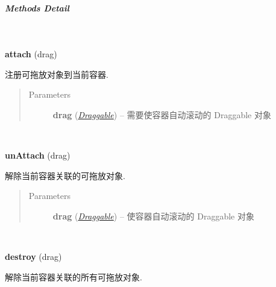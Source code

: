 \documentclass[letterpaper,10pt,english]{sphinxmanual}
\begin{document}
\subparagraph{Methods Detail}
\label{api/component/dd/scroll:methods-detail}

\begin{fulllineitems}
\label{api/component/dd/scroll:Scroll.attach}~
\begin{DUlineblock}{0em}
\item[] \textbf{attach} (drag)
\item[] 注册可拖放对象到当前容器.
\end{DUlineblock}
\begin{quote}\begin{description}
\item[{Parameters}] \leavevmode
\textbf{drag} ({\hyperref[api/component/dd/draggable:module-Draggable]{\emph{Draggable}}}) -- 需要使容器自动滚动的 Draggable 对象

\end{description}\end{quote}

\end{fulllineitems}



\begin{fulllineitems}
\label{api/component/dd/scroll:Scroll.unAttach}~
\begin{DUlineblock}{0em}
\item[] \textbf{unAttach} (drag)
\item[] 解除当前容器关联的可拖放对象.
\end{DUlineblock}
\begin{quote}\begin{description}
\item[{Parameters}] \leavevmode
\textbf{drag} ({\hyperref[api/component/dd/draggable:module-Draggable]{\emph{Draggable}}}) -- 使容器自动滚动的 Draggable 对象

\end{description}\end{quote}

\end{fulllineitems}



\begin{fulllineitems}
\label{api/component/dd/scroll:Scroll.destroy}~
\begin{DUlineblock}{0em}
\item[] \textbf{destroy} (drag)
\item[] 解除当前容器关联的所有可拖放对象.
\end{DUlineblock}

\end{fulllineitems}
\end{document}
